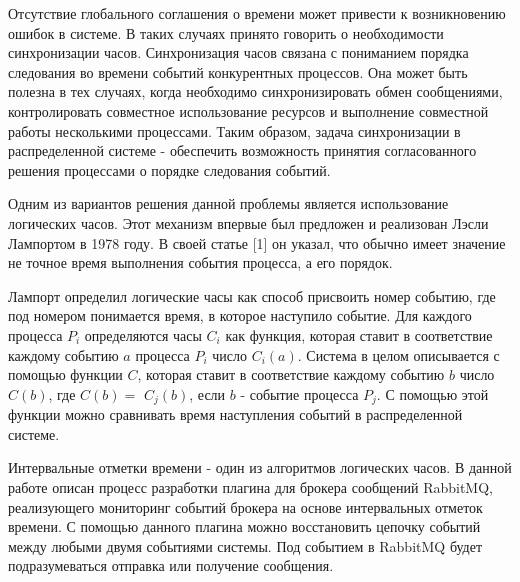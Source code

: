 





\Intro

Отсутствие глобального соглашения о времени может привести к возникновению ошибок в системе. В таких случаях принято говорить о необходимости синхронизации часов.
Синхронизация часов связана с пониманием порядка следования во времени событий конкурентных процессов. Она может быть полезна в тех случаях, когда необходимо синхронизировать обмен сообщениями, контролировать совместное использование ресурсов и выполнение совместной работы несколькими процессами. Таким образом, задача синхронизации в распределенной системе - обеспечить возможность принятия согласованного решения процессами о порядке следования событий. \par
Одним из вариантов решения данной проблемы является использование логических часов. Этот механизм впервые был предложен и реализован Лэсли Лампортом в 1978 году.
В своей статье [1] он указал, что обычно имеет значение не точное время выполнения события процесса, а его порядок. \par
Лампорт определил логические часы как способ присвоить номер событию, где под номером понимается время, в которое наступило событие. Для каждого процесса $P_i$ определяются часы $C_i$ как функция, которая ставит в соответствие каждому событию $a$ процесса $P_i$ число  $C_i(a)$. Система в целом описывается с помощью функции $C$, которая ставит в соответствие каждому событию $b$ число $C(b)$, 
где $C(b)=$ $C_j(b)$, если $b$ - событие процесса $P_j$. С помощью этой функции можно сравнивать время наступления событий в распределенной системе.\par
Интервальные отметки времени - один из алгоритмов логических часов.  
В данной работе описан процесс разработки плагина для брокера сообщений RabbitMQ, реализующего мониторинг событий брокера на основе интервальных отметок времени. С помощью данного плагина можно восстановить цепочку событий между любыми двумя событиями системы. Под событием в RabbitMQ будет подразумеваться отправка или получение сообщения. 
\newpage

